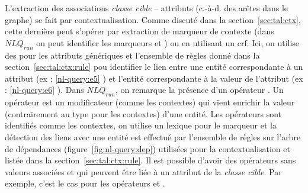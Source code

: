 L'extraction des associations \emph{classe cible} -- attributs (c.-à-d. des arêtes dans le graphe) se fait par contextualisation.
Comme discuté dans la section~\ref{sec:tal:ctx}, cette dernière peut s'opérer par extraction de marqueur de contexte (dans $NLQ_{run}$ on peut identifier les marqueurs  et ) ou en utilisant un \gls{crf}.
Ici, on utilise des  pour les attributs génériques et l'ensemble de règles donné dans la section~\ref{sec:tal:ctx:rule} pou identifier le lien entre une entité correspondante à un attribut (ex : \ref{nl-query:e5} ) et l'entité correspondante à la valeur de l'attribut (ex : \ref{nl-query:e6} ).
Dans $NLQ_{run}$, on remarque la présence d'un opérateur .
Un opérateur est un modificateur (comme les contextes) qui vient enrichir la valeur (contrairement au type pour les contextes) d'une entité.
Les opérateurs sont identifiés comme les contextes, on utilise un lexique pour le marqueur et la détection des liens avec une entité est effectué par l'ensemble de règles sur l'arbre de dépendances (figure~\ref{fig:nl-query:dep}) utilisées pour la contextualisation et listée dans la section~\ref{sec:tal:ctx:rule}.
Il est possible d'avoir des opérateurs sans valeurs associées et qui peuvent être liée à un attribut de la \emph{classe cible}.
Par exemple, c'est le cas pour les opérateurs  et .

